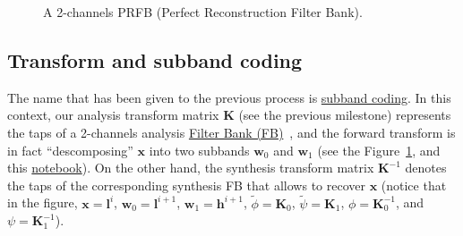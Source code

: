 \begin{figure}
  \centering
  \caption{A 2-channels PRFB (Perfect Reconstruction Filter Bank).}
  \label{fig:PRFB}
\end{figure}

\subsection{Transform and subband coding}
The name that has been given to the previous process is
\href{https://en.wikipedia.org/wiki/Sub-band_coding}{subband
  coding}. In this context, our analysis transform matrix
${\mathbf K}$ (see the previous milestone) represents the taps of a
2-channels analysis
\href{https://en.wikipedia.org/wiki/Filter_bank}{Filter Bank
  (FB)}~\cite{vetterli1995wavelets}, and the forward transform is in
fact ``descomposing'' ${\mathbf x}$ into two subbands ${\mathbf w}_0$
and ${\mathbf w}_1$ (see the Figure~\ref{fig:PRFB}, and this
\href{https://github.com/Tecnologias-multimedia/intercom/blob/master/docs/PRFB.ipynb}{notebook}). On
the other hand, the synthesis transform matrix ${\mathbf K}^{-1}$
denotes the taps of the corresponding synthesis FB that allows to
recover ${\mathbf x}$ (notice that in the figure,
${\mathbf x}={\mathbf l}^i$, ${\mathbf w}_0={\mathbf l}^{i+1}$,
${\mathbf w}_1={\mathbf h}^{i+1}$, $\tilde\phi={\mathbf K}_0$,
$\tilde\psi={\mathbf K}_1$, $\phi={\mathbf K}^{-1}_0$, and
$\psi={\mathbf K}^{-1}_1$).

